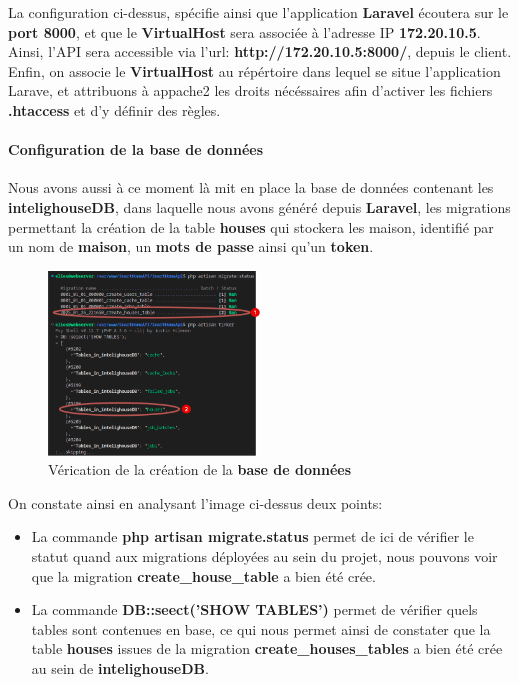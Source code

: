 \documentclass[10pt, a4paper]{report}
\begin{document}
	La configuration ci-dessus, spécifie ainsi que l'application \textbf{Laravel} écoutera sur le \textbf{port 8000}, et que le \textbf{VirtualHost} sera associée à l'adresse IP \textbf{172.20.10.5}. Ainsi, l'API sera accessible via l'url: \textbf{http://172.20.10.5:8000/}, depuis le client.\\
	Enfin, on associe le \textbf{VirtualHost} au répértoire dans lequel se situe l'application Larave, et attribuons à appache2 les droits nécéssaires afin d'activer les fichiers \textbf{.htaccess} et d'y définir des règles.
	
	\paragraph{Configuration de la base de données}
	Nous avons aussi à ce moment là mit en place la base de données contenant les \textbf{intelighouseDB}, dans laquelle nous avons généré depuis \textbf{Laravel}, les migrations permettant la création de la table \textbf{houses} qui stockera les maison, identifié par un nom de \textbf{maison}, un \textbf{mots de passe} ainsi qu'un \textbf{token}.
	
	\begin{figure}[h!]
		\centering
		\includegraphics[width=0.5\textwidth]{ressources/img/preuves/preuveMigration}
		\caption{Vérication de la création de la \textbf{base de données}}
		\label{fig:preuveBDD}
	\end{figure}
	\newpage
	On constate ainsi en analysant l'image ci-dessus deux points:
	\begin{itemize}
		\item La commande \textbf{php artisan migrate.status} permet de ici de vérifier le statut quand aux migrations déployées au sein du projet, nous pouvons voir que la migration \textbf{create\_house\_table} a bien été crée. 
		\item La commande \textbf{DB::seect('SHOW TABLES')} permet de vérifier quels tables sont contenues en base, ce qui nous permet ainsi de constater que la table \textbf{houses} issues de la migration \textbf{create\_houses\_tables} a bien été crée au sein de \textbf{intelighouseDB}.
	\end{itemize}
	
\end{document}
